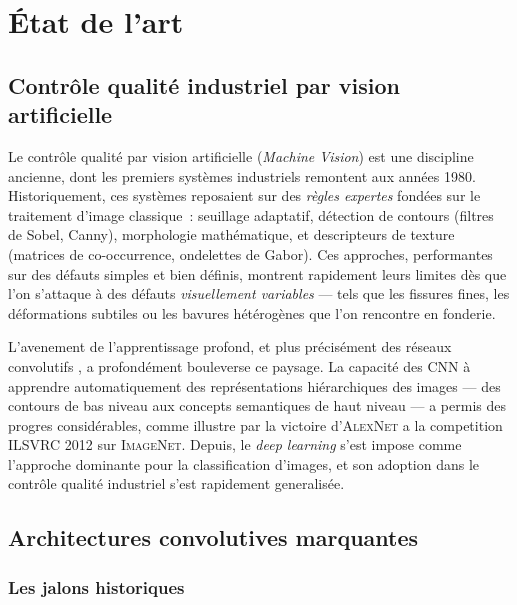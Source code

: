 \documentclass[12pt,a4paper,openany]{report}
\begin{document}
\chapter{État de l'art}

\section{Contrôle qualité industriel par vision artificielle}

Le contrôle qualité par vision artificielle (\emph{Machine Vision}) est une discipline ancienne, dont les premiers systèmes industriels remontent aux années 1980. Historiquement, ces systèmes reposaient sur des \emph{règles expertes} fondées sur le traitement d'image classique~: seuillage adaptatif, détection de contours (filtres de Sobel, Canny), morphologie mathématique, et descripteurs de texture (matrices de co-occurrence, ondelettes de Gabor). Ces approches, performantes sur des défauts simples et bien définis, montrent rapidement leurs limites dès que l'on s'attaque à des défauts \emph{visuellement variables} --- tels que les fissures fines, les déformations subtiles ou les bavures hétérogènes que l'on rencontre en fonderie.

L'avenement de l'apprentissage profond, et plus précisément des réseaux convolutifs \cite{lecun1998}, a profondément bouleverse ce paysage. La capacité des CNN à apprendre automatiquement des représentations hiérarchiques des images --- des contours de bas niveau aux concepts semantiques de haut niveau --- a permis des progres considérables, comme illustre par la victoire d'\textsc{AlexNet} \cite{krizhevsky2012} a la competition \textsc{ILSVRC} 2012 sur \textsc{ImageNet}. Depuis, le \emph{deep learning} s'est impose comme l'approche dominante pour la classification d'images, et son adoption dans le contrôle qualité industriel s'est rapidement generalisée.

\section{Architectures convolutives marquantes}

\subsection{Les jalons historiques}
\end{document}
